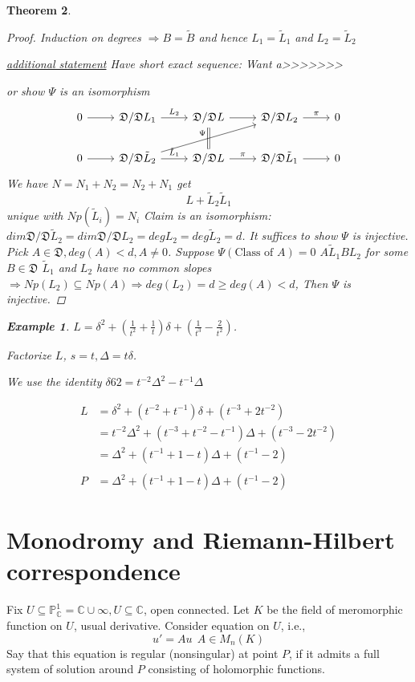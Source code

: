 \documentclass[11pt]{article}
\newtheorem{thm}{Theorem}[section]
\newtheorem{ex}[thm]{Example}
\newcommand{\cplx}{\mathbb C}
\newcommand{\frakd}{{\mathfrak D}}
\newcommand{\Lrta}{\Longrightarrow}
\begin{document}
\begin{thm}
\begin{proof}
Induction on degrees $\Lrta  B=\tilde{B}$ and hence $L_1=\tilde{L}_1$ and $L_2=\tilde{L}_2$

\underline{additional statement}
Have short exact sequence:
Want a>>>>>>>

or show $\Psi$ is an isomorphism
\[
\begin{tikzcd}
0\arrow[r]  & \frakd/\frakd L_1  \arrow[r,"L_2"] & \frakd/\frakd L\arrow[r] \arrow[d,equal] & \frakd/\frakd L_2\arrow[r,"\pi"]  & 0 \\
0\arrow[r]  & \frakd/\frakd \tilde{L}_2\ar[rru,"\Psi"]  \arrow[r,"\tilde{L}_1"] & \frakd/\frakd L\arrow[r,"\pi"] & \frakd/\frakd \tilde{L}_1\arrow[r]  & 0 
\end{tikzcd}
\]
We have $N=N_1+N_2=N_2+N_1$ get 
$$
L+\tilde{L}_2\tilde{L}_1
$$
unique with $Np(\tilde{L}_i)=N_i$
Claim is an isomorphism:
$dim \frakd/\frakd \tilde{L}_2=dim \frakd/\frakd L_2=deg L_2=deg\tilde{L}_2=d$.
It suffices to show $\Psi$ is injective. Pick $A\in\frakd,deg(A)< d, A\neq 0$. Suppose $\Psi(\text{Class of $A$})=0$ $A\tilde{L}_1B L_2$ for some $B\in \frakd$ $\tilde{L}_1$ and $L_2$ have no common slopes $\Lrta Np(L_2)\subseteq Np(A)\Lrta deg(L_2)=d\geq deg(A)< d$, Then $\Psi$ is injective.
\end{proof}

\begin{ex}
$L=\delta^2+(\frac{1}{t^2}+\frac{1}{t})\delta+(\frac{1}{t^3}-\frac{2}{t^2})$.

Factorize $L$, $s=t,\Delta=t\delta$.

We use the identity $\delta62=t^{-2}\Delta^2-t^{-1}\Delta$

$$
\begin{aligned}
L&=\delta^2+(t^{-2}+t^{-1})\delta+(t^{-3}+2t^{-2})\\
&=t^{-2}\Delta^2+(t^{-3}+t^{-2}-t^{-1})\Delta+(t^{-3}-2t^{-2})\\
&=\Delta^2+(t^{-1}+1-t)\Delta+(t^{-1}-2)\\
&\ \\
P&=\Delta^2+(t^{-1}+1-t)\Delta
+(t^{-1}-2)
\end{aligned}
$$
\end{ex}


\end{thm}
\section{Monodromy and Riemann-Hilbert correspondence}

Fix $U\subseteq \mathbb{P}^1_\cplx=\cplx\cup{\infty}, U\subseteq \cplx$, open connected. Let $K$ be the field of meromorphic function on $U$, usual derivative. Consider equation on $U$, i.e.,
$$
u'=A u\ \ A\in M_n(K)
$$
Say that this equation is regular (nonsingular) at point $P$, if it admits a full system of solution around $P$ consisting of holomorphic functions.
\end{document}
